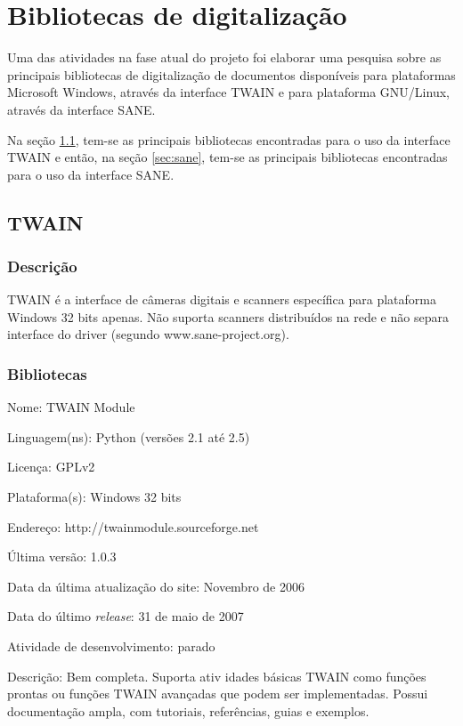 \section{Bibliotecas de digitalização}
\label{sec:pesquisa_libs}

Uma das atividades na fase atual do projeto foi elaborar uma pesquisa sobre as principais bibliotecas de digitalização de documentos disponíveis para plataformas Microsoft Windows, através da interface TWAIN e para plataforma GNU/Linux, através da interface SANE. 

Na seção \ref{sec:twain}, tem-se as principais bibliotecas encontradas para o uso da interface TWAIN e então, na seção \ref{sec:sane}, tem-se as principais bibliotecas encontradas para o uso da interface SANE.

\subsection{TWAIN}
\label{sec:twain}

\subsubsection{Descrição}
TWAIN é a interface de câmeras digitais e scanners específica para plataforma Windows 32 bits apenas. Não suporta scanners distribuídos na rede e não separa interface do driver (segundo www.sane-project.org).

\subsubsection{Bibliotecas}
\begin{description*}
	\item[Nome:] TWAIN Module
	\item[Linguagem(ns):] Python (versões 2.1 até 2.5)
	\item[Licença:] GPLv2
	\item[Plataforma(s):] Windows 32 bits
	\item[Endereço:] http://twainmodule.sourceforge.net
	\item[Última versão:] 1.0.3
	\item[Data da última atualização do site:] Novembro de 2006
	\item[Data do último {\it release}:] 31 de maio de 2007
	\item[Atividade de desenvolvimento:] parado
	\item[Descrição:] 
	Bem completa. Suporta ativ idades básicas TWAIN como funções prontas ou funções TWAIN avançadas que podem ser implementadas. Possui documentação ampla, com tutoriais, referências, guias e exemplos.
\end{description*}

